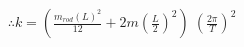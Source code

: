 \documentclass[preview]{standalone}
\begin{document}
\begin{align*}
\therefore k = (\frac{m_{rod}(L)^2}{12} + 2m(\frac{L}{2})^2)\;(\frac{2\pi}{T})^2
\end{align*}
\end{document}
